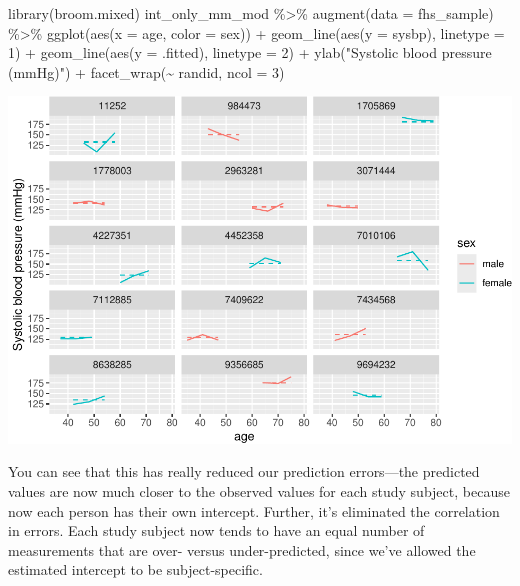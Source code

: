 \documentclass[
]{book}
\newenvironment{Shaded}{\begin{snugshade}}{\end{snugshade}}
\newcommand{\AttributeTok}[1]{\textcolor[rgb]{0.77,0.63,0.00}{#1}}
\newcommand{\DecValTok}[1]{\textcolor[rgb]{0.00,0.00,0.81}{#1}}
\newcommand{\FunctionTok}[1]{\textcolor[rgb]{0.00,0.00,0.00}{#1}}
\newcommand{\NormalTok}[1]{#1}
\newcommand{\SpecialCharTok}[1]{\textcolor[rgb]{0.00,0.00,0.00}{#1}}
\newcommand{\StringTok}[1]{\textcolor[rgb]{0.31,0.60,0.02}{#1}}
\begin{document}
\begin{Shaded}
\begin{Highlighting}[]
\FunctionTok{library}\NormalTok{(broom.mixed)}
\NormalTok{int\_only\_mm\_mod }\SpecialCharTok{\%\textgreater{}\%} 
  \FunctionTok{augment}\NormalTok{(}\AttributeTok{data =}\NormalTok{ fhs\_sample) }\SpecialCharTok{\%\textgreater{}\%} 
  \FunctionTok{ggplot}\NormalTok{(}\FunctionTok{aes}\NormalTok{(}\AttributeTok{x =}\NormalTok{ age, }\AttributeTok{color =}\NormalTok{ sex)) }\SpecialCharTok{+} 
  \FunctionTok{geom\_line}\NormalTok{(}\FunctionTok{aes}\NormalTok{(}\AttributeTok{y =}\NormalTok{ sysbp), }\AttributeTok{linetype =} \DecValTok{1}\NormalTok{) }\SpecialCharTok{+} 
  \FunctionTok{geom\_line}\NormalTok{(}\FunctionTok{aes}\NormalTok{(}\AttributeTok{y =}\NormalTok{ .fitted), }\AttributeTok{linetype =} \DecValTok{2}\NormalTok{) }\SpecialCharTok{+} 
  \FunctionTok{ylab}\NormalTok{(}\StringTok{"Systolic blood pressure (mmHg)"}\NormalTok{) }\SpecialCharTok{+} 
  \FunctionTok{facet\_wrap}\NormalTok{(}\SpecialCharTok{\textasciitilde{}}\NormalTok{ randid, }\AttributeTok{ncol =} \DecValTok{3}\NormalTok{)}
\end{Highlighting}
\end{Shaded}

\includegraphics{adv_epi_analysis_files/figure-latex/unnamed-chunk-291-1.pdf}

You can see that this has really reduced our prediction errors---the predicted
values are now much closer to the observed values for each study subject,
because now each person has their own intercept. Further, it's eliminated the
correlation in errors. Each study subject now tends to have an equal number of
measurements that are over- versus under-predicted, since we've allowed the
estimated intercept to be subject-specific.
\end{document}
